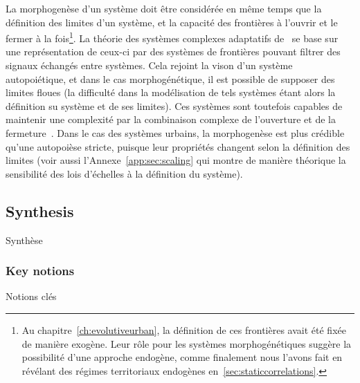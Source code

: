 La morphogenèse d'un système doit être considérée en même temps que la définition des limites d'un système, et la capacité des frontières à l'ouvrir et le fermer à la fois\footnote{Au chapitre~\ref{ch:evolutiveurban}, la définition de ces frontières avait été fixée de manière exogène. Leur rôle pour les systèmes morphogénétiques suggère la possibilité d'une approche endogène, comme finalement nous l'avons fait en révélant des régimes territoriaux endogènes en~\ref{sec:staticcorrelations}.}. La théorie des systèmes complexes adaptatifs de~\cite{holland2012signals} se base sur une représentation de ceux-ci par des systèmes de frontières pouvant filtrer des signaux échangés entre systèmes. Cela rejoint la vison d'un système autopoiétique, et dans le cas morphogénétique, il est possible de supposer des limites floues (la difficulté dans la modélisation de tels systèmes étant alors la définition su système et de ses limites). Ces systèmes sont toutefois capables de maintenir une complexité par la combinaison complexe de l'ouverture et de la fermeture~\cite{morin1976methode}. Dans le cas des systèmes urbains, la morphogenèse est plus crédible qu'une autopoièse stricte, puisque leur propriétés changent selon la définition des limites \cite{2015arXiv150707878C} (voir aussi l'Annexe~\ref{app:sec:scaling} qui montre de manière théorique la sensibilité des lois d'échelles à la définition du système).







\subsection{Synthesis}{Synthèse}


\subsubsection{Key notions}{Notions clés}



